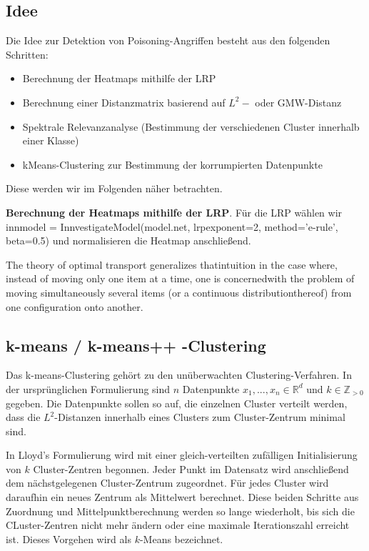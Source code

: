 \documentclass[11pt,a4paper]{article}
\numberwithin{equation}{section}
\begin{document}
	\subsection{Idee}
	
	Die Idee zur Detektion von Poisoning-Angriffen besteht aus den folgenden Schritten:
	
	\begin{itemize}
		\item Berechnung der Heatmaps mithilfe der LRP
		\item Berechnung einer Distanzmatrix basierend auf $L^2-$ oder GMW-Distanz
		\item Spektrale Relevanzanalyse (Bestimmung der verschiedenen Cluster innerhalb einer Klasse)
		\item kMeans-Clustering zur Bestimmung der korrumpierten Datenpunkte
	\end{itemize}

	Diese werden wir im Folgenden näher betrachten.
	
	\noindent\textbf{Berechnung der Heatmaps mithilfe der LRP}.	Für die LRP wählen wir innmodel = InnvestigateModel(model.net, lrpexponent=2,
	method='e-rule', beta=0.5) und normalisieren die Heatmap anschließend.
	
	
	
	The theory of optimal transport generalizes thatintuition in the case where, instead of moving only one item at a time, one is concernedwith the problem of moving simultaneously several items (or a continuous distributionthereof) from one configuration onto another.\cite{computationalOT}
	\subsection{k-means / k-means++ -Clustering}
	Das k-means-Clustering gehört zu den unüberwachten Clustering-Verfahren. In der ursprünglichen Formulierung sind $n$ Datenpunkte $x_1,...,x_n \in \mathbb{R}^d$ und $k \in \mathbb{Z}_{>0}$ gegeben. Die Datenpunkte sollen so auf, die einzelnen Cluster verteilt werden, dass die $L^2$-Distanzen innerhalb eines Clusters zum Cluster-Zentrum minimal sind. 
	
	
	In Lloyd's Formulierung \cite{lloyd1982least} wird mit einer gleich-verteilten zufälligen Initialisierung von $k$ Cluster-Zentren begonnen. Jeder Punkt im Datensatz wird anschließend dem nächstgelegenen Cluster-Zentrum zugeordnet. Für jedes Cluster wird daraufhin ein neues Zentrum als Mittelwert berechnet.
	Diese beiden Schritte aus Zuordnung und Mittelpunktberechnung werden so lange wiederholt, bis sich die CLuster-Zentren nicht mehr ändern oder eine maximale Iterationszahl erreicht ist. Dieses Vorgehen wird als $k$-Means bezeichnet.
	
\end{document}
